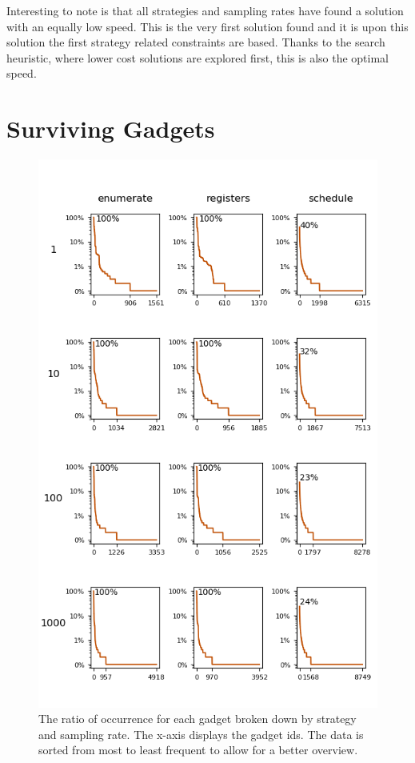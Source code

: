 Interesting to note is that all strategies and sampling rates have found a solution with
an equally low speed. This is the very first solution found and it is upon this solution
the first strategy related constraints are based. Thanks to the search heuristic, where
lower cost solutions are explored first, this is also the optimal speed.

\section{Surviving Gadgets}

\begin{figure}[htp]
	\centering
	\includegraphics[width=\textwidth,height=0.9\textheight]{results/figures/gadgets}
	\caption{\small The ratio of occurrence for each gadget broken down by strategy and sampling rate.
The x-axis displays the gadget ids. The data is sorted from most to least frequent to allow
for a better overview.}
	\label{fig:gadgets}
\end{figure}


